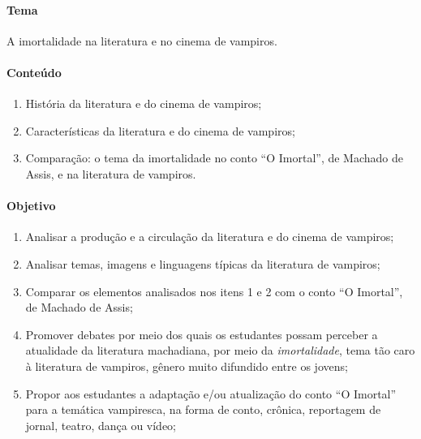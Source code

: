 \documentclass{extarticle}
\begin{document}

\paragraph{Tema} A imortalidade na literatura e no cinema de vampiros.

\paragraph{Conteúdo}
\begin{enumerate}
\item História da literatura e do cinema de vampiros; 

\item Características da literatura e do cinema de vampiros; 

\item Comparação: o
tema da imortalidade no conto ``O Imortal'', de Machado de Assis, e na
literatura de vampiros.
\end{enumerate}

\paragraph{Objetivo} 
\begin{enumerate}
\item Analisar a produção e a circulação da literatura e
do cinema de vampiros; 

\item Analisar temas, imagens e linguagens típicas
da literatura de vampiros; 

\item Comparar os elementos analisados nos itens
1 e 2 com o conto ``O Imortal'', de Machado de Assis; 

\item Promover
debates por meio dos quais os estudantes possam perceber a atualidade da
literatura machadiana, por meio da \emph{imortalidade}, tema tão caro à
literatura de vampiros, gênero muito difundido entre os jovens; 

\item
Propor aos estudantes a adaptação e/ou atualização do conto ``O
Imortal'' para a temática vampiresca, na forma de conto, crônica,
reportagem de jornal, teatro, dança ou vídeo;
\end{enumerate}
\end{document}
